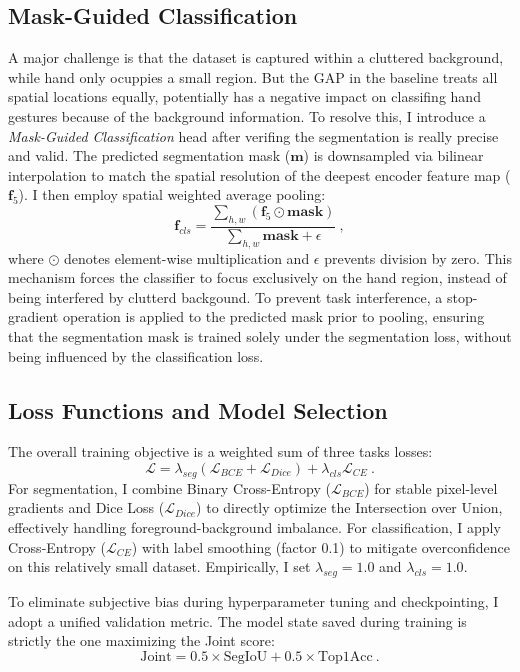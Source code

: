 \documentclass[conference]{IEEEtran}
\begin{document}
\subsection{Mask-Guided Classification}
A major challenge is that the dataset is captured within a cluttered background, while hand only ocuppies a small region. But the GAP in the baseline treats all spatial locations equally, potentially has a negative impact on classifing hand gestures because of the background information. To resolve this, I introduce a \textit{Mask-Guided Classification} head after verifing the segmentation is really precise and valid. The predicted segmentation mask ($\mathbf{m}$) is downsampled via bilinear interpolation to match the spatial resolution of the deepest encoder feature map ($\mathbf{f}_5$). I then employ spatial weighted average pooling:
\begin{equation}
\mathbf{f}_{cls} = \frac{\sum_{h,w} (\mathbf{f}_5 \odot \mathbf{mask})}{\sum_{h,w} \mathbf{mask} + \epsilon} \ ,
\end{equation}
where $\odot$ denotes element-wise multiplication and $\epsilon$ prevents division by zero. This mechanism forces the classifier to focus exclusively on the hand region, instead of being interfered by clutterd backgound. To prevent task interference, a stop-gradient operation is applied to the predicted mask prior to pooling, ensuring that the segmentation mask is trained solely under the segmentation loss, without being influenced by the classification loss.

\subsection{Loss Functions and Model Selection}
The overall training objective is a weighted sum of three tasks losses:
\begin{equation}
\mathcal{L} = \lambda_{seg}\left(\mathcal{L}_{BCE} + \mathcal{L}_{Dice}\right) + \lambda_{cls}\mathcal{L}_{CE} \ .
\end{equation}
For segmentation, I combine Binary Cross-Entropy ($\mathcal{L}_{BCE}$) for stable pixel-level gradients and Dice Loss ($\mathcal{L}_{Dice}$) to directly optimize the Intersection over Union, effectively handling foreground-background imbalance. For classification, I apply Cross-Entropy ($\mathcal{L}_{CE}$) with label smoothing (factor 0.1) to mitigate overconfidence on this relatively small dataset. Empirically, I set $\lambda_{seg} = 1.0$ and $\lambda_{cls} = 1.0$.

To eliminate subjective bias during hyperparameter tuning and checkpointing, I adopt a unified validation metric. The model state saved during training is strictly the one maximizing the Joint score:
\begin{equation}
\text{Joint} = 0.5 \times \text{SegIoU} + 0.5 \times \text{Top1Acc} \ .
\end{equation}
\end{document}
